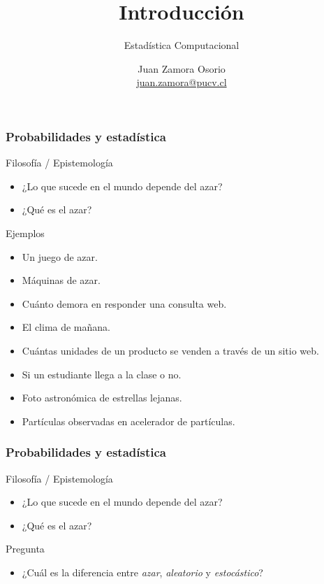 \documentclass[table]{beamer}
\title{Introducción}
\subtitle{Estadística Computacional}
\author[J.Z.O-2023]{Juan Zamora Osorio\\\url{juan.zamora@pucv.cl}}
\institute[PUCV]{Instituto de Estadística\\Pontificia Universidad Cat\'olica de Valpara\'iso}
\begin{document}
\frame{\titlepage}




\begin{frame}
    \frametitle{Probabilidades y estadística}
    \begin{block}{Filosofía / Epistemología}
        \begin{itemize}
            \item ¿Lo que sucede en el mundo depende del azar?
            \item ¿Qué es el azar?
        \end{itemize}
    \end{block}
    \begin{exampleblock}{Ejemplos}
        \begin{itemize}
            \item Un juego de azar.
            \item Máquinas de azar.
            \item Cuánto demora en responder una consulta web.
            \item El clima de mañana.
            \item Cuántas unidades de un producto se venden a través de un sitio web.
            \item Si un estudiante llega a la clase o no.
            \item Foto astronómica de estrellas lejanas.
            \item Partículas observadas en acelerador de partículas.
        \end{itemize}
    \end{exampleblock}
\end{frame}

\begin{frame}
    \frametitle{Probabilidades y estadística}
    \begin{block}{Filosofía / Epistemología}
        \begin{itemize}
            \item ¿Lo que sucede en el mundo depende del azar?
            \item ¿Qué es el azar?
        \end{itemize}
    \end{block}
    \begin{alertblock}{Pregunta}
        \begin{itemize}
            \item ¿Cuál es la diferencia entre \emph{azar}, \emph{aleatorio} y \emph{estocástico}?
        \end{itemize}
    \end{alertblock}
\end{frame}
\end{document}
